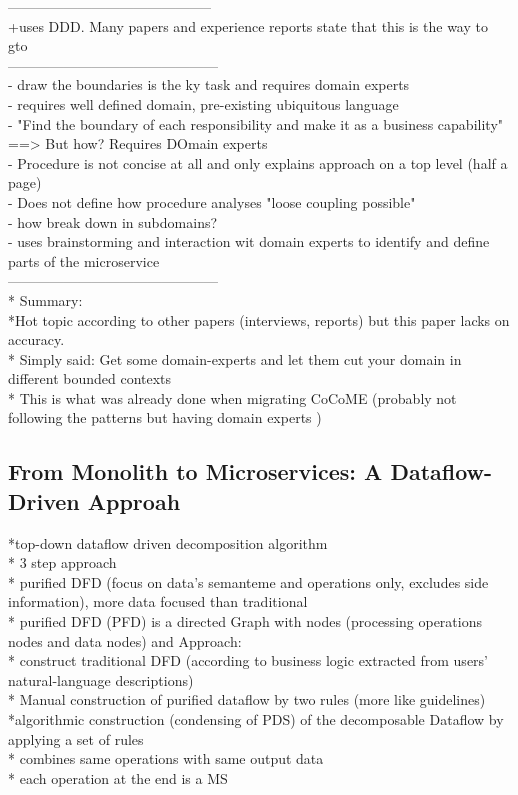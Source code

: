 --------------------------------------------\\


+uses DDD. Many papers and experience reports state that this is the way to gto\\


---------------------------------------------\\

- draw the boundaries is the ky task and requires domain experts\\
- requires well defined domain, pre-existing ubiquitous language\\
- "Find the boundary of each responsibility and make it as a business capability" ==> But how? Requires DOmain experts\\
- Procedure is not concise at all and only explains approach on a top level (half a page)\\
- Does not define how procedure analyses "loose coupling possible"\\
- how break down in subdomains?\\
- uses brainstorming and interaction wit domain experts to identify and define parts of the microservice\\


---------------------------------------------\\

* Summary: \\
*Hot topic according to other papers (interviews, reports) but this paper lacks on accuracy.  \\
* Simply said: Get some domain-experts and let them cut your domain in different bounded contexts \\
* This is what was already done when migrating CoCoME (probably not following the patterns but having domain experts )\\

\subsection{From Monolith to Microservices: A Dataflow-Driven Approah}

*top-down dataflow driven decomposition algorithm\\
* 3 step approach \\
* purified DFD (focus on data's semanteme and operations only, excludes side information), more data focused than traditional \\
* purified DFD (PFD) is a directed Graph with nodes (processing operations nodes and data nodes) and
Approach: \\
* construct traditional DFD (according to business logic extracted from users' natural-language descriptions) \\
* Manual construction of purified dataflow by two rules (more like guidelines)\\
*algorithmic construction (condensing of PDS) of the decomposable Dataflow by applying a set of rules\\
* combines same operations with same output data\\
* each operation at the end is a MS\\



